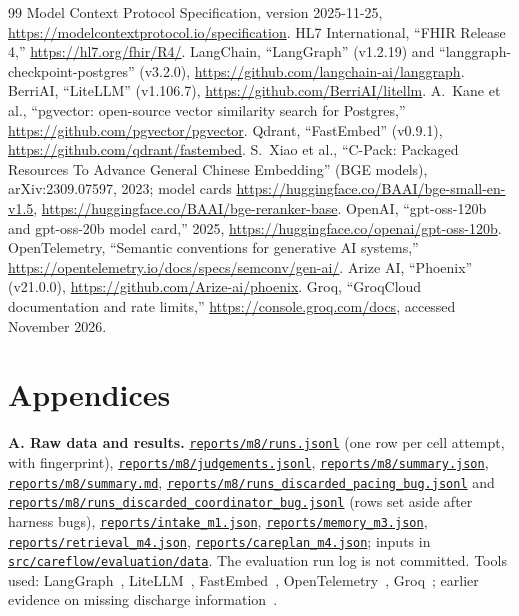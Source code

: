 \documentclass[10pt,a4paper]{article}
\newcommand{\repourl}{https://github.com/saideepaksana/careflow}
\newcommand{\rev}{cs5903-final-2026}
\newcommand{\file}[1]{\href{\repourl/blob/\rev/#1}{\nolinkurl{#1}}}
\newcommand{\dir}[1]{\href{\repourl/tree/\rev/#1}{\nolinkurl{#1}}}
\begin{document}
\begin{thebibliography}{99}
 Model Context Protocol Specification, version 2025-11-25, \url{https://modelcontextprotocol.io/specification}.
 HL7 International, ``FHIR Release 4,'' \url{https://hl7.org/fhir/R4/}.
 LangChain, ``LangGraph'' (v1.2.19) and ``langgraph-checkpoint-postgres'' (v3.2.0), \url{https://github.com/langchain-ai/langgraph}.
 BerriAI, ``LiteLLM'' (v1.106.7), \url{https://github.com/BerriAI/litellm}.
 A.~Kane et al., ``pgvector: open-source vector similarity search for Postgres,'' \url{https://github.com/pgvector/pgvector}.
 Qdrant, ``FastEmbed'' (v0.9.1), \url{https://github.com/qdrant/fastembed}.
 S.~Xiao et al., ``C-Pack: Packaged Resources To Advance General Chinese Embedding'' (BGE models), arXiv:2309.07597, 2023; model cards \url{https://huggingface.co/BAAI/bge-small-en-v1.5}, \url{https://huggingface.co/BAAI/bge-reranker-base}.
 OpenAI, ``gpt-oss-120b and gpt-oss-20b model card,'' 2025, \url{https://huggingface.co/openai/gpt-oss-120b}.
 OpenTelemetry, ``Semantic conventions for generative AI systems,'' \url{https://opentelemetry.io/docs/specs/semconv/gen-ai/}.
 Arize AI, ``Phoenix'' (v21.0.0), \url{https://github.com/Arize-ai/phoenix}.
 Groq, ``GroqCloud documentation and rate limits,'' \url{https://console.groq.com/docs}, accessed November 2026.
\end{thebibliography}
\endgroup

\FloatBarrier
\section*{Appendices}

\textbf{A. Raw data and results.} \file{reports/m8/runs.jsonl} (one row per cell attempt, with fingerprint), \file{reports/m8/judgements.jsonl}, \file{reports/m8/summary.json}, \file{reports/m8/summary.md}, \file{reports/m8/runs_discarded_pacing_bug.jsonl} and \file{reports/m8/runs_discarded_coordinator_bug.jsonl} (rows set aside after harness bugs), \file{reports/intake_m1.json}, \file{reports/memory_m3.json}, \file{reports/retrieval_m4.json}, \file{reports/careplan_m4.json}; inputs in \dir{src/careflow/evaluation/data}. The evaluation run log is not committed. Tools used: LangGraph~\cite{langgraph}, LiteLLM~\cite{litellm}, FastEmbed~\cite{fastembed}, OpenTelemetry~\cite{otel}, Groq~\cite{groq}; earlier evidence on missing discharge information~\cite{kripalani}.
\end{document}
